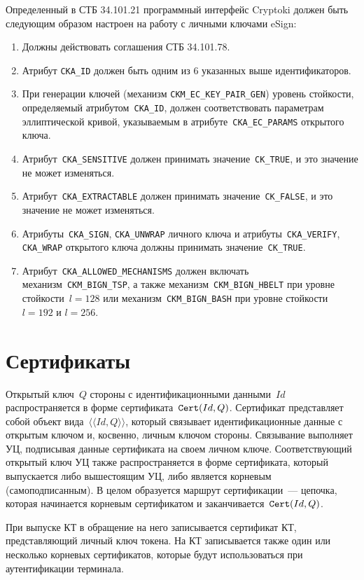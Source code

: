 Определенный в СТБ 34.101.21 программный интерфейс Cryptoki должен быть
следующим образом настроен на работу с личными ключами eSign:
\begin{enumerate}
\item
Должны действовать соглашения СТБ 34.101.78.
\item
Атрибут \verb|CKA_ID| должен быть одним из 6 указанных выше идентификаторов.
\item
При генерации ключей (механизм \verb|CKM_EC_KEY_PAIR_GEN|) уровень стойкости, 
определяемый атрибутом~\verb|CKA_ID|, должен соответствовать параметрам 
эллиптической кривой, указываемым в атрибуте~\verb|CKA_EC_PARAMS| открытого 
ключа.
\item
Атрибут~\verb|CKA_SENSITIVE| должен принимать значение~\verb|CK_TRUE|,
и это значение не может изменяться.
\item
Атрибут~\verb|CKA_EXTRACTABLE| должен принимать значение~\verb|CK_FALSE|,
и это значение не может изменяться.
\item
Атрибуты~\verb|CKA_SIGN|, \verb|CKA_UNWRAP| личного ключа и 
атрибуты~\verb|CKA_VERIFY|, \verb|CKA_WRAP| открытого ключа должны принимать 
значение~\verb|CK_TRUE|.
\item
Атрибут~\verb|CKA_ALLOWED_MECHANISMS| должен включать механизм~\verb|CKM_BIGN_TSP|,
а также механизм~\verb|CKM_BIGN_HBELT| при уровне стойкости~$l=128$ или
механизм~\verb|CKM_BIGN_BASH| при уровне стойкости~$l=192$ и $l=256$.
\end{enumerate}

\section{Сертификаты}\label{OBJ.Certs}

Открытый ключ~$Q$ стороны с идентификационными данными~$Id$ распространяется в 
форме сертификата~$\texttt{Cert}(Id,Q)$. 
%
Сертификат представляет собой объект вида~$\langle\langle Id,Q\rangle\rangle$,
который связывает идентификационные данные с открытым ключом и, косвенно, личным 
ключом стороны.
%
Связывание выполняет УЦ, подписывая данные сертификата на своем личном ключе. 
Соответствующий открытый ключ УЦ также распространяется в форме сертификата,
который выпускается либо вышестоящим УЦ, либо является корневым (самоподписанным).
%
В целом образуется маршрут сертификации~--- цепочка, которая начинается 
корневым сертификатом и заканчивается~$\texttt{Cert}(Id,Q)$.

При выпуске КТ в обращение на него записывается сертификат КТ, представляющий
личный ключ токена. На КТ записывается также один или несколько корневых 
сертификатов, которые будут использоваться при аутентификации терминала. 

